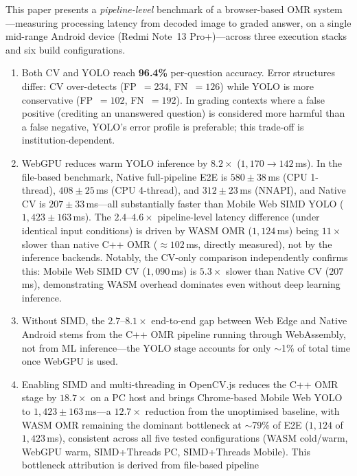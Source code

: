 \documentclass[conference]{IEEEtran}
\begin{document}
This paper presents a \emph{pipeline-level} benchmark of a
browser-based OMR system---measuring processing latency from decoded
image to graded answer, on a single mid-range Android device (Redmi
Note~13 Pro+)---across three execution stacks and six build
configurations.
\begin{enumerate}[leftmargin=*, itemsep=2pt, topsep=4pt]
  \item Both CV and YOLO reach \textbf{96.4\%} per-question accuracy.
    Error structures differ: CV over-detects (FP~$=234$, FN~$=126$)
    while YOLO is more conservative (FP~$=102$, FN~$=192$).
    In grading contexts where a false positive (crediting an unanswered
    question) is considered more harmful than a false negative,
    YOLO's error profile is preferable; this trade-off is
    institution-dependent.
  \item WebGPU reduces warm YOLO inference by $8.2\times$
    ($1{,}170\to142$\,ms). In the file-based benchmark, Native full-pipeline
    E2E is $580\pm38$\,ms (CPU 1-thread), $408\pm25$\,ms (CPU 4-thread),
    and $312\pm23$\,ms (NNAPI), and Native CV is $207\pm33$\,ms---all
    substantially faster than Mobile Web
    SIMD YOLO ($1{,}423\pm163$\,ms). The $2.4$--$4.6\times$ pipeline-level
    latency difference (under identical input conditions) is driven by WASM
    OMR ($1{,}124$\,ms) being $11\times$ slower than native C++ OMR
    ($\approx102$\,ms, directly measured), not by the inference backends.
    Notably, the CV-only comparison independently confirms this: Mobile Web
    SIMD CV ($1{,}090$\,ms) is $5.3\times$ slower than Native CV ($207$\,ms),
    demonstrating WASM overhead dominates even without deep learning inference.
  \item Without SIMD, the $2.7$--$8.1\times$ end-to-end gap between
    Web Edge and Native Android stems from the C++ OMR pipeline running
    through WebAssembly, not from ML inference---the YOLO stage accounts
    for only $\sim$1\% of total time once WebGPU is used.
  \item Enabling SIMD and multi-threading in OpenCV.js reduces the C++
    OMR stage by $18.7\times$ on a PC host and brings Chrome-based Mobile
    Web YOLO to $1{,}423\pm163$\,ms---a $12.7\times$ reduction from the
    unoptimised baseline, with WASM OMR remaining the dominant
    bottleneck at $\sim$79\% of E2E ($1{,}124$ of $1{,}423$\,ms),
    consistent across all five tested configurations (WASM cold/warm,
    WebGPU warm, SIMD+Threads PC, SIMD+Threads Mobile).
    This bottleneck attribution is derived from file-based pipeline

\end{enumerate}
\end{document}
